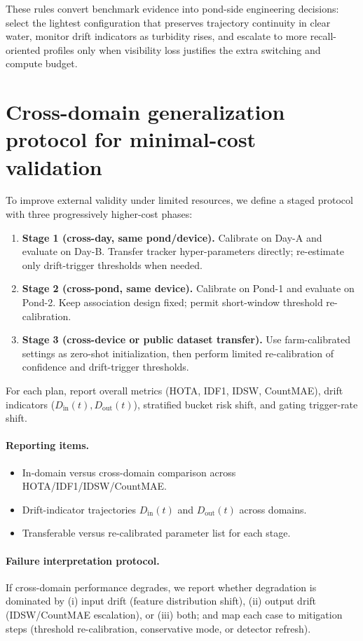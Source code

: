 \documentclass[5p,twocolumn,a4paper]{elsarticle}
\begin{document}
These rules convert benchmark evidence into pond-side engineering decisions: select the lightest configuration that preserves trajectory continuity in clear water, monitor drift indicators as turbidity rises, and escalate to more recall-oriented profiles only when visibility loss justifies the extra switching and compute budget.

\section{Cross-domain generalization protocol for minimal-cost validation}
To improve external validity under limited resources, we define a staged protocol with three progressively higher-cost phases:
\begin{enumerate}
  \item \textbf{Stage 1 (cross-day, same pond/device).}
  Calibrate on Day-A and evaluate on Day-B. Transfer tracker hyper-parameters directly; re-estimate only drift-trigger thresholds when needed.
  \item \textbf{Stage 2 (cross-pond, same device).}
  Calibrate on Pond-1 and evaluate on Pond-2. Keep association design fixed; permit short-window threshold re-calibration.
  \item \textbf{Stage 3 (cross-device or public dataset transfer).}
  Use farm-calibrated settings as zero-shot initialization, then perform limited re-calibration of confidence and drift-trigger thresholds.
\end{enumerate}

For each plan, report overall metrics (HOTA, IDF1, IDSW, CountMAE), drift indicators ($D_{\mathrm{in}}(t), D_{\mathrm{out}}(t)$), stratified bucket risk shift, and gating trigger-rate shift.

\paragraph{Reporting items.}
\begin{itemize}
  \item In-domain versus cross-domain comparison across HOTA/IDF1/IDSW/CountMAE.
  \item Drift-indicator trajectories $D_{\mathrm{in}}(t)$ and $D_{\mathrm{out}}(t)$ across domains.
  \item Transferable versus re-calibrated parameter list for each stage.
\end{itemize}

\paragraph{Failure interpretation protocol.}
If cross-domain performance degrades, we report whether degradation is dominated by (i) input drift (feature distribution shift), (ii) output drift (IDSW/CountMAE escalation), or (iii) both; and map each case to mitigation steps (threshold re-calibration, conservative mode, or detector refresh).
\end{document}
